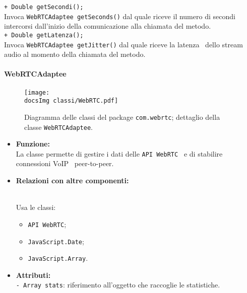 {{\begin{sloppypar}
{{{\begin{itemize}
{					\texttt{+ Double getSecondi();}\\
					Invoca \texttt{WebRTCAdaptee getSeconds()} dal quale riceve il numero di secondi intercorsi dall'inizio della comunicazione alla chiamata del metodo.\\
					
					\texttt{+ Double getLatenza();}\\
					Invoca \texttt{WebRTCAdaptee getJitter()} dal quale riceve la latenza\g~ dello stream\g~ audio al momento della chiamata del metodo.\\
				}
			\end{itemize}
			}
	}	
	
	
	

		\paragraph{WebRTCAdaptee}\label{par:WebRTCAdaptee}{
		
	\begin{figure}[h!tbp]
		\centering
		\texttt{[image: \\docsImg classi/WebRTC.pdf]}
	\caption{Diagramma delle classi del package \nolinkurl{com.webrtc}; dettaglio della classe \nolinkurl{WebRTCAdaptee}.}
	\label{fig:webRTCadaptee}
	\end{figure}
		
			\begin{itemize}
				
				\item[] \textbf{Funzione:}{\\
					La classe permette di gestire i dati delle \texttt{API WebRTC\g~} e di stabilire connessioni VoIP\g~ peer-to-peer\g.\\
				}
			
				\item[] \textbf{Relazioni con altre componenti:}{\\
					Usa le classi:
					\begin{itemize}
						\item[] \texttt{API WebRTC};
						\item[] \texttt{JavaScript.Date};
						\item[] \texttt{JavaScript.Array}.\\
					\end{itemize}
				}
				
				\item[] \textbf{Attributi:}{\\
				\texttt{- Array stats}: riferimento all'oggetto che raccoglie le statistiche.\\
					
}
\end{itemize}}}
\end{sloppypar}}}
